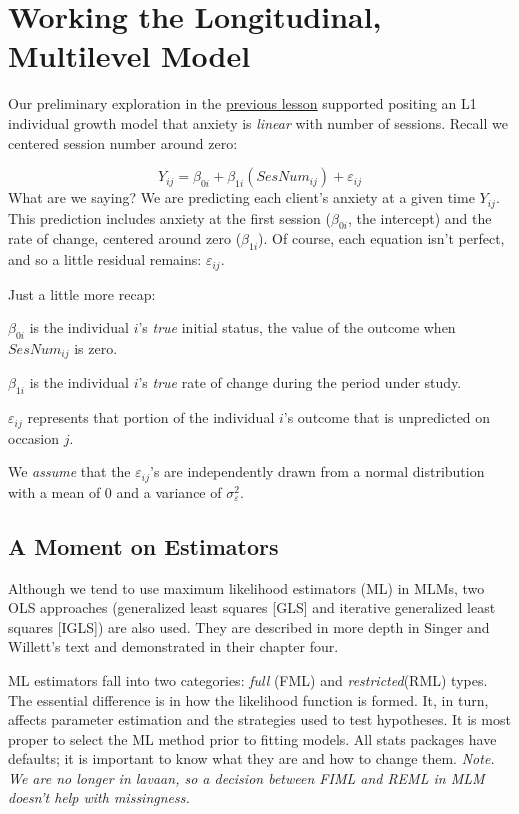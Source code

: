 \documentclass[
  11pt,
]{book}
\begin{document}
\hypertarget{working-the-longitudinal-multilevel-model}{%
\section{Working the Longitudinal, Multilevel Model}\label{working-the-longitudinal-multilevel-model}}

Our preliminary exploration in the \protect\hyperlink{MLMexplore}{previous lesson} supported positing an L1 individual growth model that anxiety is \emph{linear} with number of sessions. Recall we centered session number around zero:

\[Y_{ij}=\beta_{0i}+\beta _{1i}(SesNum_{ij})+\varepsilon _{ij}\]
What are we saying? We are predicting each client's anxiety at a given time \(Y_{ij}\). This prediction includes anxiety at the first session (\(\beta_{0i}\), the intercept) and the rate of change, centered around zero (\(\beta _{1i}\)). Of course, each equation isn't perfect, and so a little residual remains: \(\varepsilon _{ij}\).

Just a little more recap:

\(\beta _{0i}\) is the individual \(i\)'s \emph{true} initial status, the value of the outcome when \(SesNum_{ij}\) is zero.

\(\beta _{1i}\) is the individual \(i\)'s \emph{true} rate of change during the period under study.

\(\varepsilon _{ij}\) represents that portion of the individual \(i\)'s outcome that is unpredicted on occasion \(j\).

We \emph{assume} that the \(\varepsilon _{ij}\)'s are independently drawn from a normal distribution with a mean of 0 and a variance of \(\sigma _{\varepsilon }^{2}\).

\hypertarget{a-moment-on-estimators}{%
\subsection{A Moment on Estimators}\label{a-moment-on-estimators}}

Although we tend to use maximum likelihood estimators (ML) in MLMs, two OLS approaches (generalized least squares {[}GLS{]} and iterative generalized least squares {[}IGLS{]}) are also used. They are described in more depth in Singer and Willett's text \citeyearpar{singer_applied_2003} and demonstrated in their chapter four.

ML estimators fall into two categories: \emph{full} (FML) and \emph{restricted}(RML) types. The essential difference is in how the likelihood function is formed. It, in turn, affects parameter estimation and the strategies used to test hypotheses. It is most proper to select the ML method prior to fitting models. All stats packages have defaults; it is important to know what they are and how to change them. \emph{Note. We are no longer in lavaan, so a decision between FIML and REML in MLM doesn't help with missingness.}
\end{document}
